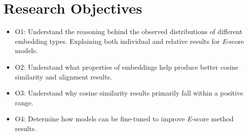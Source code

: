 \chapter{Research Objectives}
\begin{itemize}
    \item{\hypertarget{O1}{O1}: Understand the reasoning behind the observed distributions of different embedding types. Explaining both individual and relative results for \textit{E}-score models.}
    \item{\hypertarget{O2}{O2}: Understand what properties of embeddings help produce better cosine similarity and alignment results.}
    \item{\hypertarget{O3}{O3}: Understand why cosine similarity results primarily fall within a positive range.}
    \item{\hypertarget{O4}{O4}: Determine how models can be fine-tuned to improve \textit{E}-score method results.}
\end{itemize}